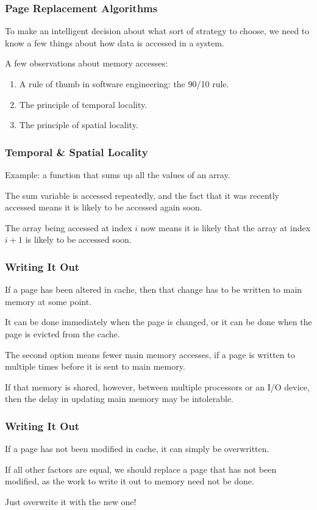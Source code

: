 \begin{frame}
\frametitle{Page Replacement Algorithms}
To make an intelligent decision about what sort of strategy to choose, we need to know a few things about how data is accessed in a system.

A few observations about memory accesses:

\begin{enumerate}
	\item A rule of thumb in software engineering: the 90/10 rule.
	\item The principle of \alert{temporal locality}. 
	\item The principle of \alert{spatial locality}.
\end{enumerate}

\end{frame}

\begin{frame}
\frametitle{Temporal \& Spatial Locality}

Example: a function that sums up all the values of an array. 

The sum variable is accessed repeatedly, and the fact that it was recently accessed means it is likely to be accessed again soon. 

The array being accessed at index $i$ now means it is likely that the array at index $i+1$ is likely to be accessed soon.

\end{frame}

\begin{frame}
\frametitle{Writing It Out}

If a page has been altered in cache, then that change has to be written to main memory at some point. 

It can be done immediately when the page is changed, or it can be done when the page is evicted from the cache. 

The second option means fewer main memory accesses, if a page is written to multiple times before it is sent to main memory.

If that memory is shared, however, between multiple processors or an I/O device, then the delay in updating main memory may be intolerable. 

\end{frame}

\begin{frame}
\frametitle{Writing It Out}


If a page has not been modified in cache, it can simply be overwritten. 

If all other factors are equal, we should replace a page that has not been modified, as the work to write it out to memory need not be done.

Just overwrite it with the new one!

\end{frame}

